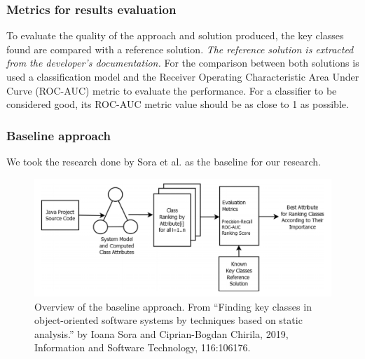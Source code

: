 \documentclass{beamer}
\begin{document}

 \begin{frame}
\frametitle{Metrics for results evaluation}
 To evaluate the quality of the approach and solution produced,
the key classes found are compared with a reference solution.
\textit{The reference solution is extracted from the developer's documentation.}
\vskip 0.3cm
For the comparison between both solutions is used a classification model and the Receiver Operating Characteristic Area Under Curve (ROC-AUC) metric to evaluate the performance.
\vskip 0.3cm
For a classifier to be considered good, its ROC-AUC metric value should be as close to 1 as possible.
\end{frame}


 \begin{frame}
\frametitle{Baseline approach}
We took the research done by Sora et al. \cite{Finding-key-classes} as the baseline for our research.
 \begin{figure}[H]
\centering
\includegraphics[width=\textwidth]{baseline_approach.PNG}
\caption{Overview of the baseline approach. From “Finding key classes in object-oriented
software systems by techniques based on static analysis.” by Ioana Sora and Ciprian-Bogdan Chirila, 2019, Information and Software Technology, 116:106176.  }
\label{fig:baseline_approach}
\centering
\end{figure}

\end{frame}

\end{document}
